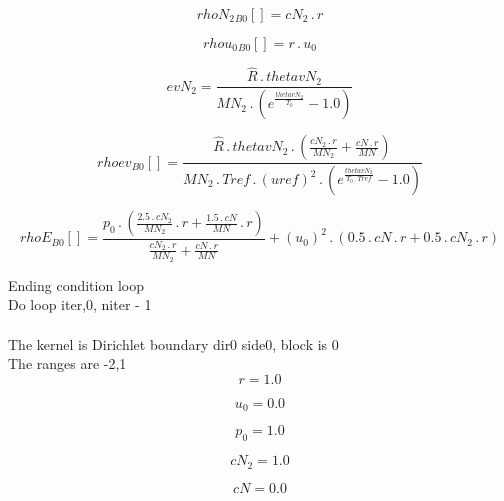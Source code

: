 \documentclass{article}
\begin{document}
\begin{dmath}{rhoN_{2}{_{B0}}}[{}] = cN_{2} \,.\, r\end{dmath}

\begin{dmath}{rhou_{0}{_{B0}}}[{}] = r \,.\, u_{0}\end{dmath}

\begin{dmath}evN_{2} = \frac{\hat{R} \,.\, thetavN_{2}}{MN_{2} \,.\, \left(e^{\frac{thetavN_{2}}{T_{0}}} - 1.0\right)}\end{dmath}

\begin{dmath}{rhoev{_{B0}}}[{}] = \frac{\hat{R} \,.\, thetavN_{2} \,.\, \left(\frac{cN_{2} \,.\, r}{MN_{2}} + \frac{cN \,.\, r}{MN}\right)}{MN_{2} \,.\, Tref \,.\, \left(uref \right)^{2} \,.\, \left(e^{\frac{thetavN_{2}}{T_{0} \,.\, Tref}} - 
1.0\right)}\end{dmath}

\begin{dmath}{rhoE{_{B0}}}[{}] = \frac{p_{0} \,.\, \left(\frac{2.5 \,.\, cN_{2}}{MN_{2}} \,.\, r + \frac{1.5 \,.\, cN}{MN} \,.\, r\right)}{\frac{cN_{2} \,.\, r}{MN_{2}} + \frac{cN \,.\, r}{MN}} + \left(u_{0} \right)^{2} \,.\, \left(0.5 \,.\, cN \,.\, 
r + 0.5 \,.\, cN_{2} \,.\, r\right)\end{dmath}

\noindent Ending condition loop %
\\\noindent Do loop iter,0, niter - 1\\
\\\noindent The kernel is Dirichlet boundary dir0 side0, block is 0\\\noindent The ranges are -2,1\\\begin{dmath}r = 1.0\end{dmath}

\begin{dmath}u_{0} = 0.0\end{dmath}

\begin{dmath}p_{0} = 1.0\end{dmath}

\begin{dmath}cN_{2} = 1.0\end{dmath}

\begin{dmath}cN = 0.0\end{dmath}
\end{document}
